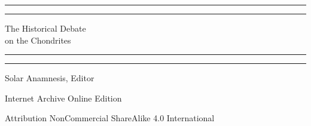 \documentclass[a4paper, 12pt, oneside]{article}
\begin{document}
\renewcommand\thefootnote{{\color{customColor}{\arabic{footnote}}}}
\let\oldfootnote\footnote
    \renewcommand{\footnote}[1]{\oldfootnote{{\color{customColor}#1}}}
\begin{titlepage} %
	\centering %
	\tcshape %

	
	\rule{\textwidth}{1.6pt}\vspace*{-\baselineskip}\vspace*{2pt} %
	\rule{\textwidth}{0.4pt} %
	
	\vspace{0.75\baselineskip} %
	
	{\LARGE The Historical Debate\\[0.5cm] on the Chondrites} %
	
	\vspace{0.75\baselineskip} %
	
	\rule{\textwidth}{0.4pt}\vspace*{-\baselineskip}\vspace{3.2pt} %
	\rule{\textwidth}{1.6pt} %
	
	\vspace{1\baselineskip} %
	
	
	{Solar Anamnesis, Editor\\} %
	
	\vspace*{1\baselineskip} %
	

		
	\vspace*{\fill}%
	
	\vspace{1\baselineskip} %

    Internet Archive Online Edition  %
	
	{\small Attribution NonCommercial ShareAlike 4.0 International } %
\end{titlepage}
\setlength{\parskip}{1mm plus1mm minus1mm}
\setcounter{tocdepth}{3}
\setcounter{secnumdepth}{4}
\tableofcontents
\clearpage
\listoffigures
\clearpage
\end{document}

